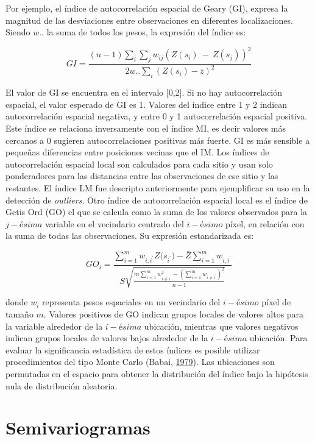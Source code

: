 \documentclass[11pt,b5paper,]{krantz}
\begin{document}
Por ejemplo, el índice de autocorrelación espacial de Geary (GI),
expresa la magnitud de las desviaciones entre observaciones en
diferentes localizaciones. Siendo \(w..\) la suma de todos los pesos, la
expresión del índice es:

\[GI=\frac{(n-1)\sum_{i}\sum_{j}{w_{ij}(Z(s_i)\ -\ Z(s_j))^2}}{2w..\sum_{i}{(Z(s_i)-\bar{z})}^2}\]

El valor de GI se encuentra en el intervalo {[}0,2{]}. Si no hay
autocorrelación espacial, el valor esperado de GI es 1. Valores del
índice entre 1 y 2 indican autocorrelación espacial negativa, y entre 0
y 1 autocorrelación espacial positiva. Este índice se relaciona
inversamente con el índice MI, es decir valores más cercanos a 0
sugieren autocorrelaciones positivas más fuerte. GI es más sensible a
pequeñas diferencias entre posiciones vecinas que el IM. Los índices de
autocorrelación espacial local son calculados para cada sitio y usan
solo ponderadores para las distancias entre las observaciones de ese
sitio y las restantes. El índice LM fue descripto anteriormente para
ejemplificar su uso en la detección de \emph{outliers}. Otro índice de
autocorrelación espacial local es el índice de Getis Ord (GO) el que se
calcula como la suma de los valores observados para la \(j-ésima\)
variable en el vecindario centrado del \(i-ésimo\) píxel, en relación
con la suma de todas las observaciones. Su expresión estandarizada es:

\[{GO}_i=\frac{\sum_{i=1}^{m}{w_{i,i^\prime}{Z(s}_{i^\prime})-\bar{Z}\sum_{i=1}^{m}w_{i,i^\prime}}}{S\sqrt{\frac{m\sum_{i=1}^{m}{w_{i\neq i^\prime}^2-\left(\sum_{i=1}^{m}w_{i\neq i^\prime}\right)^2}}{n-1}}}\]

donde \(w_i\) representa pesos espaciales en un vecindario del
\(i-ésimo\) píxel de tamaño \(m\). Valores positivos de GO indican
grupos locales de valores altos para la variable alrededor de la
\(i-ésima\) ubicación, mientras que valores negativos indican grupos
locales de valores bajos alrededor de la \(i-ésima\) ubicación. Para
evaluar la significancia estadística de estos índices es posible
utilizar procedimientos del tipo Monte Carlo (Babai,
\protect\hyperlink{ref-Babai_1979}{1979}). Las ubicaciones son
permutadas en el espacio para obtener la distribución del índice bajo la
hipótesis nula de distribución aleatoria.

\section{Semivariogramas}\label{semivariogramas}
\end{document}
